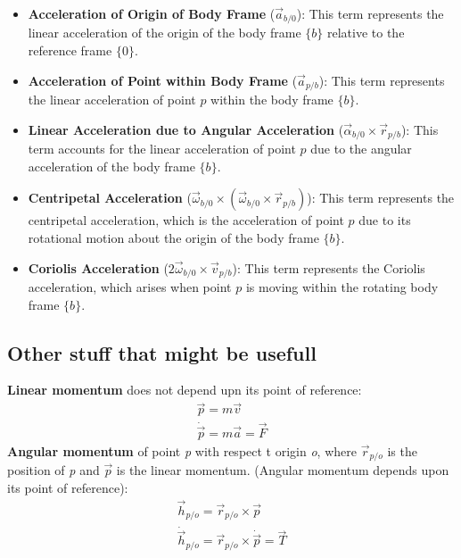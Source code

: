 \begin{itemize}
    \item \textbf{Acceleration of Origin of Body Frame} (\( \vec{a}_{b/0} \)): This term represents the linear acceleration of the origin of the body frame \( \{b\} \) relative to the reference frame \( \{0\} \).
    \item \textbf{Acceleration of Point within Body Frame} (\( \vec{a}_{p/b} \)): This term represents the linear acceleration of point \( p \) within the body frame \( \{b\} \).
    \item \textbf{Linear Acceleration due to Angular Acceleration} (\( \vec{\alpha}_{b/0} \times \vec{r}_{p/b} \)): This term accounts for the linear acceleration of point \( p \) due to the angular acceleration of the body frame \( \{b\} \).
    \item \textbf{Centripetal Acceleration} (\( \vec{\omega}_{b/0} \times (\vec{\omega}_{b/0} \times \vec{r}_{p/b}) \)): This term represents the centripetal acceleration, which is the acceleration of point \( p \) due to its rotational motion about the origin of the body frame \( \{b\} \).
    \item \textbf{Coriolis Acceleration} (\( 2 \vec{\omega}_{b/0} \times \vec{v}_{p/b} \)): This term represents the Coriolis acceleration, which arises when point \( p \) is moving within the rotating body frame \( \{b\} \).
\end{itemize}



\subsection{Other stuff that might be usefull}
\textbf{Linear momentum} does not depend upn its point of reference:
\begin{subequations}
    \begin{align}
        \vec{p} = m\vec{v} \\
        \dot{\vec{p}} = m\vec{a} = \vec{F}
    \end{align}
\end{subequations}
\textbf{Angular momentum} of point \textit{p} with respect t origin \textit{o}, where $\vec{r}_{p/o}$ is the position of \textit{p} and $\vec{p}$ is the linear momentum. (Angular momentum depends upon its point of reference):
\begin{subequations}
    \begin{align}
        \vec{h}_{p/o} = \vec{r}_{p/o} \times \vec{p} \\
        \dot{\vec{h}}_{p/o} = \vec{r}_{p/o} \times \dot{\vec{p}} = \vec{T}
    \end{align}
\end{subequations}